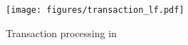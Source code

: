 
\begin{figure}[t]
    \centering
    \texttt{[image: figures/transaction\_lf.pdf]}
    \vspace{-4mm}
    \caption{Transaction processing in \sysname
    }
    \label{fig:transaction_lifecycle}
    \vspace{-4mm}
\end{figure}

